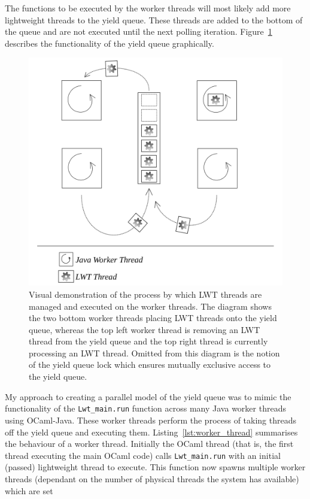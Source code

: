 \documentclass[12pt,twoside,notitlepage]{report}
\begin{document}
The functions to be executed by the worker threads will most likely add more lightweight threads to the yield queue. These threads are added to the bottom of the queue and are not executed until the next polling iteration.
Figure~\ref{fig:yield_queue} describes the functionality of the yield queue graphically.
\begin{figure}[h!]
\includegraphics[width=\linewidth]{yield_queue}
\caption{Visual demonstration of the process by which LWT threads are managed and executed on the worker threads. The diagram shows the two bottom worker threads placing LWT threads onto the yield queue, whereas the top left worker
thread is removing an LWT thread from the yield queue and the top right thread is currently processing an LWT thread. Omitted from this diagram is the notion of the yield queue lock which ensures mutually exclusive access to the yield
queue.}
\label{fig:yield_queue}
\end{figure}
%
%
My approach to creating a parallel model of the yield queue was to mimic the functionality of the {\tt Lwt\_main.run} function across many Java worker threads using OCaml-Java. These worker threads perform the process of
taking threads off the yield queue and executing them. Listing~\ref{lst:worker_thread} summarises the behaviour of a worker thread. Initially the OCaml thread (that is, the first thread executing the main
OCaml code) calls {\tt Lwt\_main.run} with an initial (passed) lightweight thread to execute. This function now spawns multiple worker threads (dependant on the number of physical threads the system has available) which are set
\end{document}
